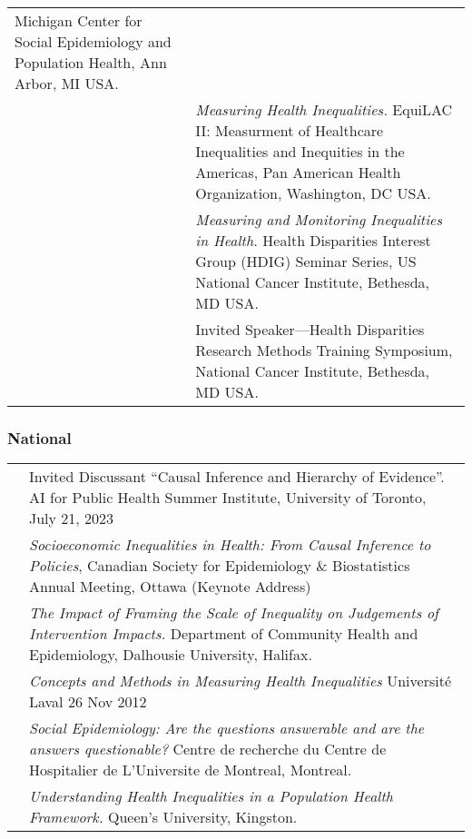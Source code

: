 \documentclass[
  letterpaper,
  DIV=11,
  numbers=noendperiod]{scrartcl}
\begin{document}
\begin{longtable}[]{@{}
  >{\raggedright\arraybackslash}p{}
  >{\raggedright\arraybackslash}p{}@{}}
Michigan Center for Social Epidemiology and Population Health, Ann
Arbor, MI USA. \\
2009 & \emph{Measuring Health Inequalities.} EquiLAC II: Measurment of
Healthcare Inequalities and Inequities in the Americas, Pan American
Health Organization, Washington, DC USA. \\
2008 & \emph{Measuring and Monitoring Inequalities in Health.} Health
Disparities Interest Group (HDIG) Seminar Series, US National Cancer
Institute, Bethesda, MD USA. \\
2006 & Invited Speaker---Health Disparities Research Methods Training
Symposium, National Cancer Institute, Bethesda, MD USA. \\
\end{longtable}

\subsubsection{National}\label{national}

\begin{longtable}[]{@{}
  >{\raggedright\arraybackslash}p{}
  >{\raggedright\arraybackslash}p{}@{}}
\toprule\noalign{}
\endhead
\bottomrule\noalign{}
\endlastfoot
2023 & Invited Discussant ``Causal Inference and Hierarchy of
Evidence''. AI for Public Health Summer Institute, University of
Toronto, July 21, 2023 \\
2019 & \emph{Socioeconomic Inequalities in Health: From Causal Inference
to Policies}, Canadian Society for Epidemiology \& Biostatistics Annual
Meeting, Ottawa (Keynote Address) \\
2013 & \emph{The Impact of Framing the Scale of Inequality on Judgements
of Intervention Impacts.} Department of Community Health and
Epidemiology, Dalhousie University, Halifax. \\
2012 & \emph{Concepts and Methods in Measuring Health Inequalities}
Université Laval 26 Nov 2012 \\
2011 & \emph{Social Epidemiology: Are the questions answerable and are
the answers questionable?} Centre de recherche du Centre de Hospitalier
de L'Universite de Montreal, Montreal. \\
2008 & \emph{Understanding Health Inequalities in a Population Health
Framework.} Queen's University, Kingston. \\
\end{longtable}
\end{document}
